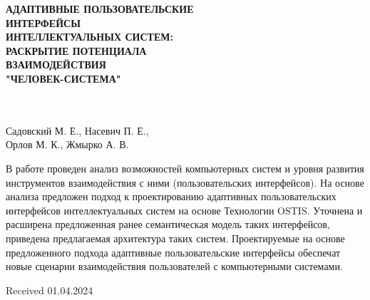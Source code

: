 \documentclass{article}
\begin{document}
\begin{multicols}{2}
\begin{center}
\textbf{АДАПТИВНЫЕ ПОЛЬЗОВАТЕЛЬСКИЕ\\
ИНТЕРФЕЙСЫ\\
ИНТЕЛЛЕКТУАЛЬНЫХ СИСТЕМ:\\
РАСКРЫТИЕ ПОТЕНЦИАЛА\\
ВЗАИМОДЕЙСТВИЯ\\
"ЧЕЛОВЕК-СИСТЕМА"\\\\}\\
\end{center}
\begin{center}
\large
Садовский М. Е., Насевич П. Е.,\\
Орлов М. К., Жмырко А. В.
\end{center}
В работе проведен анализ возможностей компьютерных систем и уровня развития инструментов взаимодействия с ними (пользовательских интерфейсов). На
основе анализа предложен подход к проектированию
адаптивных пользовательских интерфейсов интеллектуальных систем на основе Технологии OSTIS. Уточнена и расширена предложенная ранее семантическая
модель таких интерфейсов, приведена предлагаемая
архитектура таких систем. Проектируемые на основе
предложенного подхода адаптивные пользовательские
интерфейсы обеспечат новые сценарии взаимодействия пользователей с компьютерными системами.\\
\begin{flushright}
Received 01.04.2024
\end{flushright}

\end{multicols}
\end{document}
